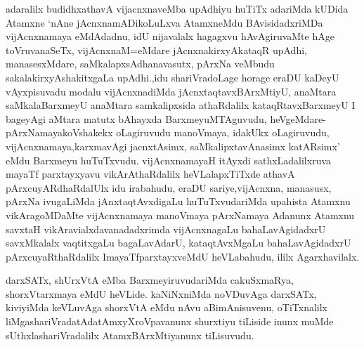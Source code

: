 \begin{artha}
adaralilx budidhxathavA vijacnxnaveMba upAdhiyu huTiTx adariMda kUDida Atamxne `nAne jAcnxnamADikoLuLxva AtamxneMdu BAvisidadxriMDa vijAcnxnamaya eMdAdadnu, idU nijavalalx hagagxvu hAvAgiruvaMte hAge toVruvanaSeTx, vijAcnxnaM=eMdare jAcnxnakirxyAkataqR upAdhi, manasesxMdare, saMkalapxsAdhanavasutx, pArxNa veMbudu sakalakirxyAshakitxgaLa upAdhi.,idu shariVradoLage horage eraDU kaDeyU vAyxpisuvadu modalu vijAcnxnadiMda jAcnxtaqtavxBArxMtiyU, anaMtara saMkalaBarxmeyU anaMtara samkalipxsida athaRdalilx kataqRtavxBarxmeyU I bageyAgi aMtara matutx bAhayxda BarxmeyuMTAguvudu, heVgeMdare-pArxNamayakoVshakekx oLagiruvudu manoVmaya, idakUkx oLagiruvudu, vijAcnxnamaya,karxmavAgi jacnxtAsimx, saMkalipxtavAnasimx katARsimx' eMdu Barxmeyu huTuTxvudu. vijAcnxnamayaH itAyxdi sathxLadalilxruva mayaTf parxtayxyavu vikArAthaRdalilx heVLalapxTiTxde athavA pArxcuyARdhaRdalUlx idu irabahudu, eraDU sariye,vijAcnxna, manasusx, pArxNa ivugaLiMda jAnxtaqtAvxdigaLu huTuTxvudariMda upahista Atamxnu vikAragoMDaMte vijAcnxnamaya manoVmaya pArxNamaya Adanunx Atamxnu savxtaH vikAravialxdavanadadxrimda vijAcnxnagaLu bahaLavAgidadxrU savxMkalalx vaqtitxgaLu bagaLavAdarU, kataqtAvxMgaLu bahaLavAgidadxrU pArxcuyaRthaRdalilx ImayaTfparxtayxveMdU heVLabahudu, ililx Agarxhavilalx.

darxSATx, shUrxVtA eMba BarxmeyiruvudariMda cakuSxmaRya, shorxVtarxmaya eMdU heVLide. kaNiNxniMda noVDuvAga darxSATx, kiviyiMda keVLuvAga shorxVtA eMdu nAvu aBimAnisuvenu, oTiTxnalilx liMgashariVradatAdatAmxyXroVpavanunx shurxtiyu tiLiside inunx muMde sUthxlashariVradalilx AtamxBArxMtiyanunx tiLisuvudu.
\end{artha}

